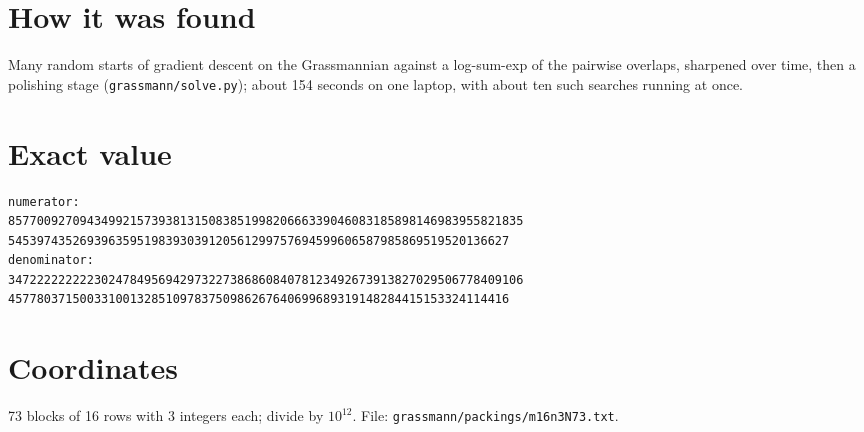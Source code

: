 \documentclass[11pt,a4paper]{article}
\begin{document}
\section{How it was found}
Many random starts of gradient descent on the Grassmannian against a log-sum-exp of the pairwise overlaps, sharpened over time, then a polishing stage (\texttt{grassmann/solve.py}); about 154 seconds on one laptop, with about ten such searches running at once.


\appendix
\section{Exact value}
{\small
\begin{verbatim}
numerator:
857700927094349921573938131508385199820666339046083185898146983955821835
5453974352693963595198393039120561299757694599606587985869519520136627
denominator:
347222222222302478495694297322738686084078123492673913827029506778409106
4577803715003310013285109783750986267640699689319148284415153324114416
\end{verbatim}}

\section{Coordinates}
73 blocks of 16 rows with 3 integers each; divide by $10^{12}$. File: \texttt{grassmann/packings/m16n3N73.txt}.
{\tiny
\begin{multicols}{3}
\end{multicols}}
\end{document}
